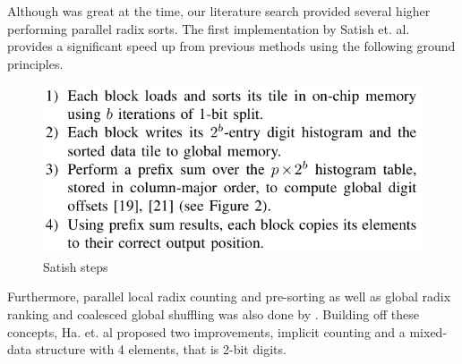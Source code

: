 \documentclass{article}
\begin{document}
Although \citep{zagharadixvector} was great at the time, our literature search provided several higher performing parallel radix sorts. The first implementation by Satish et. al. provides a significant speed up from previous methods using the following ground principles.
\begin{figure} [H]
    \centering
    \includegraphics[width=\linewidth]{report/images/satish.PNG}
    \caption{Satish steps \citep{satish}}
    \label{fig:enter-label}
\end{figure} Furthermore, parallel local radix counting and pre-sorting as well as global radix ranking and coalesced global shuffling was also done by \citep{satish}. Building off these concepts, Ha. et. al proposed two improvements, implicit counting and a mixed-data structure with 4 elements, that is 2-bit digits.
\end{document}
